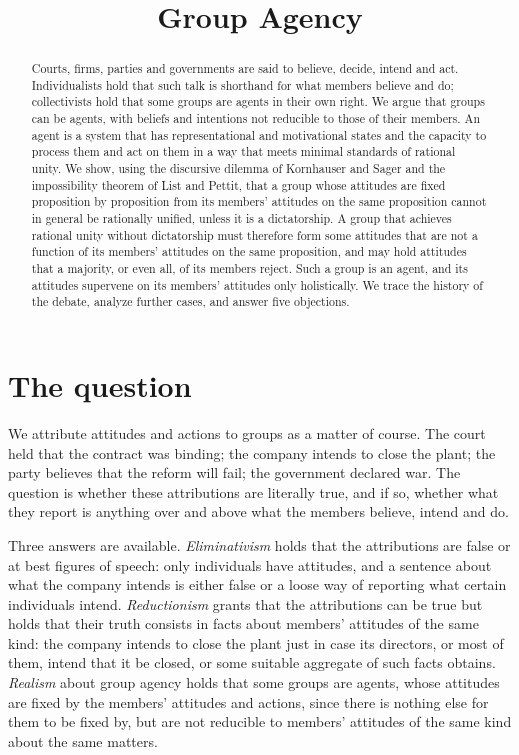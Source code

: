 \documentclass{situationist-preprint}
\title{Group Agency}
\begin{document}
\maketitle

\begin{abstract}
Courts, firms, parties and governments are said to believe, decide, intend and act. Individualists hold that such talk is shorthand for what members believe and do; collectivists hold that some groups are agents in their own right. We argue that groups can be agents, with beliefs and intentions not reducible to those of their members. An agent is a system that has representational and motivational states and the capacity to process them and act on them in a way that meets minimal standards of rational unity. We show, using the discursive dilemma of Kornhauser and Sager and the impossibility theorem of List and Pettit, that a group whose attitudes are fixed proposition by proposition from its members' attitudes on the same proposition cannot in general be rationally unified, unless it is a dictatorship. A group that achieves rational unity without dictatorship must therefore form some attitudes that are not a function of its members' attitudes on the same proposition, and may hold attitudes that a majority, or even all, of its members reject. Such a group is an agent, and its attitudes supervene on its members' attitudes only holistically. We trace the history of the debate, analyze further cases, and answer five objections.
\end{abstract}

\section{The question}\label{s:question}

We attribute attitudes and actions to groups as a matter of course. The court held that the contract was binding; the company intends to close the plant; the party believes that the reform will fail; the government declared war. The question is whether these attributions are literally true, and if so, whether what they report is anything over and above what the members believe, intend and do.

Three answers are available. \emph{Eliminativism} holds that the attributions are false or at best figures of speech: only individuals have attitudes, and a sentence about what the company intends is either false or a loose way of reporting what certain individuals intend. \emph{Reductionism} grants that the attributions can be true but holds that their truth consists in facts about members' attitudes of the same kind: the company intends to close the plant just in case its directors, or most of them, intend that it be closed, or some suitable aggregate of such facts obtains. \emph{Realism} about group agency holds that some groups are agents, whose attitudes are fixed by the members' attitudes and actions, since there is nothing else for them to be fixed by, but are not reducible to members' attitudes of the same kind about the same matters.
\end{document}
